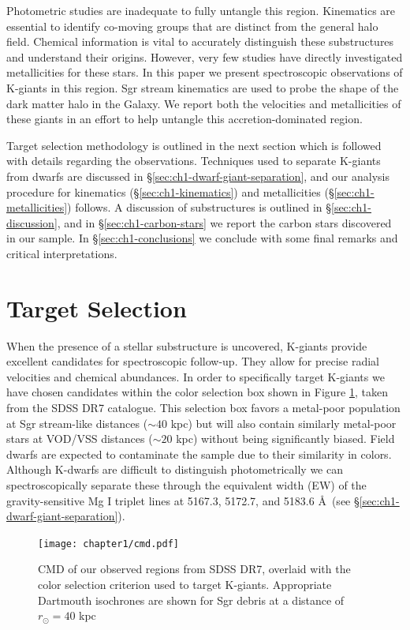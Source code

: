 Photometric studies are inadequate to fully untangle this region. Kinematics are essential to identify co-moving groups that are distinct from the general halo field. Chemical information is vital to accurately distinguish these substructures and understand their origins. However, very few studies have directly investigated metallicities for these stars. In this paper we present spectroscopic observations of K-giants in this region.  Sgr stream kinematics are used to probe the shape of the dark matter halo in the Galaxy. We report both the velocities and metallicities of these giants in an effort to help untangle this accretion-dominated region.

Target selection methodology is outlined in the next section which is followed with details regarding the observations. Techniques used to separate K-giants from dwarfs are discussed in \S\ref{sec:ch1-dwarf-giant-separation}, and our analysis procedure for kinematics (\S\ref{sec:ch1-kinematics}) and metallicities (\S\ref{sec:ch1-metallicities}) follows. A discussion of substructures is outlined in \S\ref{sec:ch1-discussion}, and in \S\ref{sec:ch1-carbon-stars} we report the carbon stars discovered in our sample. In \S\ref{sec:ch1-conclusions} we conclude with some final remarks and critical interpretations. 

\section{Target Selection}
\label{sec:ch1-target-selection}

When the presence of a stellar substructure is uncovered, K-giants provide excellent candidates for spectroscopic follow-up. They allow for precise radial velocities and chemical abundances. In order to specifically target K-giants we have chosen candidates within the color selection box shown in Figure \ref{fig:cmd-target-selection}, taken from the SDSS DR7 catalogue. This selection box favors a metal-poor population at Sgr stream-like distances ($\sim40$ kpc) but will also contain similarly metal-poor stars at VOD/VSS distances ($\sim20$ kpc) without being significantly biased. Field dwarfs are expected to contaminate the sample due to their similarity in colors. Although K-dwarfs are difficult to distinguish photometrically we can spectroscopically separate these through the equivalent width (EW) of the  gravity-sensitive Mg I triplet lines at 5167.3, 5172.7, and 5183.6 \AA\ (see \S\ref{sec:ch1-dwarf-giant-separation}).

\begin{figure}[h]
	\texttt{[image: chapter1/cmd.pdf]}
	\caption{CMD of our observed regions from SDSS DR7, overlaid with the color selection criterion used to target K-giants. Appropriate Dartmouth isochrones \citep{Dotter;et-al_2008} are shown for Sgr debris at a distance of $r_\odot =40$ kpc \citep{Belokurov;et-al_2006}}
	\label{fig:cmd-target-selection}
\end{figure}

